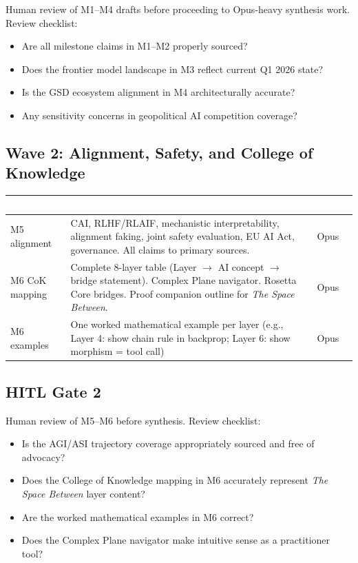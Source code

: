 \documentclass[11pt,letterpaper]{article}
\newcommand{\tableheader}[1]{\textbf{\sffamily\textcolor{white}{#1}}}
\begin{document}
Human review of M1--M4 drafts before proceeding to Opus-heavy synthesis work. Review checklist:
\begin{itemize}[leftmargin=*]
\item Are all milestone claims in M1--M2 properly sourced?
\item Does the frontier model landscape in M3 reflect current Q1 2026 state?
\item Is the GSD ecosystem alignment in M4 architecturally accurate?
\item Any sensitivity concerns in geopolitical AI competition coverage?
\end{itemize}

\subsection{Wave 2: Alignment, Safety, and College of Knowledge}

\begin{center}
\begin{tabularx}{\textwidth}{L{3cm}XC{2cm}}
\toprule
{}
\tableheader{Task} & \tableheader{Specification} & \tableheader{Model} \\
\midrule
M5 alignment & CAI, RLHF/RLAIF, mechanistic interpretability, alignment faking, joint safety evaluation, EU AI Act, governance. All claims to primary sources. & Opus \\
M6 CoK mapping & Complete 8-layer table (Layer $\to$ AI concept $\to$ bridge statement). Complex Plane navigator. Rosetta Core bridges. Proof companion outline for \textit{The Space Between}. & Opus \\
M6 examples & One worked mathematical example per layer (e.g., Layer 4: show chain rule in backprop; Layer 6: show morphism = tool call) & Opus \\
\bottomrule
\end{tabularx}
\end{center}

\subsection{HITL Gate 2}

Human review of M5--M6 before synthesis. Review checklist:
\begin{itemize}[leftmargin=*]
\item Is the AGI/ASI trajectory coverage appropriately sourced and free of advocacy?
\item Does the College of Knowledge mapping in M6 accurately represent \textit{The Space Between} layer content?
\item Are the worked mathematical examples in M6 correct?
\item Does the Complex Plane navigator make intuitive sense as a practitioner tool?
\end{itemize}
\end{document}
